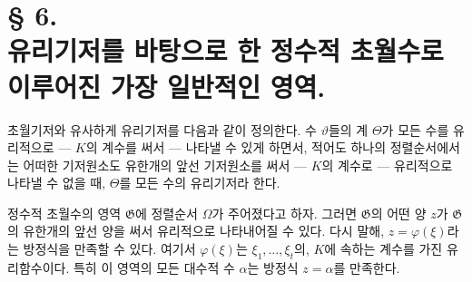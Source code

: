 \section*{\centering § 6.\\[0.35em]
유리기저를 바탕으로 한 정수적 초월수로 이루어진 가장 일반적인 영역.}

초월기저와 유사하게 유리기저를 다음과 같이 정의한다. \glqq{}수 $\vartheta$들의 계 $\Theta$가 모든 수를 유리적으로 --- $K$의 계수를 써서 --- 나타낼 수 있게 하면서, 적어도 하나의 정렬순서에서는 어떠한 기저원소도 유한개의 앞선 기저원소를 써서 --- $K$의 계수로 --- 유리적으로 나타낼 수 없을 때, $\Theta$를 모든 수의 유리기저라 한다.\grqq{}

정수적 초월수의 영역 $\mathfrak G$에 정렬순서 $\Omega$가 주어졌다고 하자. 그러면 $\mathfrak G$의 어떤 양 $z$가 $\mathfrak G$의 유한개의 앞선 양을 써서 유리적으로 나타내어질 수 있다. 다시 말해, $z=\varphi(\xi)$라는 방정식을 만족할 수 있다. 여기서 $\varphi(\xi)$는 $\xi_1,\ldots,\xi_t$의, $K$에 속하는 계수를 가진 유리함수이다. 특히 이 영역의 모든 대수적 수 $\alpha$는 방정식 $z=\alpha$를 만족한다.

